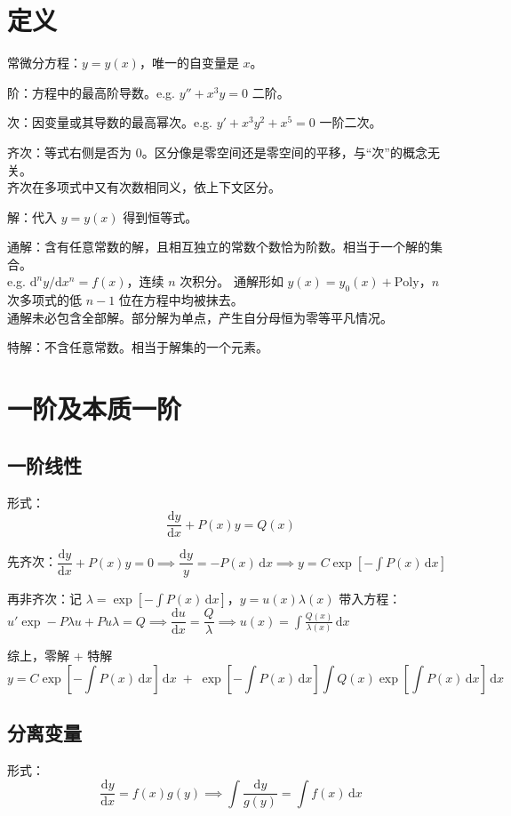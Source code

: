 \documentclass[12pt, a4paper, UTF8, openany]{ctexbook}
\newcommand{\dif}{\mathrm{d}}
\newcommand{\difx}{\,\mathrm{d}x}
\begin{document}
    \section{定义}
    常微分方程：$y = y(x)$，唯一的自变量是 $x$。

    阶：方程中的最高阶导数。e.g. $y'' + x^3y = 0$ 二阶。

    次：因变量或其导数的最高幂次。e.g. $y' + x^3y^2 + x^5 = 0$ 一阶二次。

    齐次：等式右侧是否为 $0$。区分像是零空间还是零空间的平移，与“次”的概念无关。\\
    齐次在多项式中又有次数相同义，依上下文区分。

    解：代入 $y = y(x)$ 得到恒等式。

    通解：含有任意常数的解，且相互独立的常数个数恰为阶数。相当于一个解的集合。\\
    e.g. $\dif^n y / \dif x^n = f(x)$，连续 $n$ 次积分。
    通解形如 $y(x) = y_0(x) + \mathrm{Poly}$，$n$ 次多项式的低 $n - 1$ 位在方程中均被抹去。\\
    {\heiti 通解未必包含全部解}。部分解为单点，产生自分母恒为零等平凡情况。

    特解：不含任意常数。相当于解集的一个元素。

    \section{一阶及本质一阶}
        \subsection{一阶线性}
        形式：$$\frac{\dif y}{\dif x} + P(x)y = Q(x)$$

        先齐次：$\dfrac{\dif y}{\dif x} + P(x)y = 0 \implies \dfrac{\dif y}{y} = -P(x)\difx 
        \implies y = C\exp\left[-\int P(x)\difx\right]$

        再非齐次：记 $\lambda = \exp\left[-\int P(x)\difx\right]$，$y = u(x)\lambda(x)$ 带入方程：\\
        $u'\exp - P\lambda u + Pu\lambda = Q \implies \dfrac{\dif u}{\dif x} = \dfrac{Q}{\lambda} 
            \implies u(x) = \int \frac{Q(x)}{\lambda(x)} \difx$

        综上，零解 + 特解
        $$y = C\exp\left[-\int P(x)\difx\right]\difx 
            \; + \; \exp\left[-\int P(x)\difx\right]\int Q(x)\exp\left[\int P(x)\difx\right]\difx$$
        
        \subsection{分离变量}
        形式：$$\frac{\dif y}{\dif x} = f(x)g(y) \implies \int \frac{\dif y}{g(y)} = \int f(x)\difx$$
\end{document}
